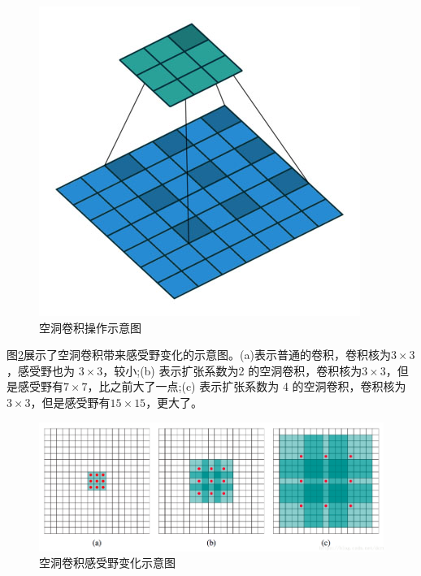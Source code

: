 \documentclass[cn]{elegantbook}
\begin{document}
\begin{figure}[!h]
\begin{minipage}[t]{0.3\textwidth}
	\end{minipage}
	\begin{minipage}[t]{0.3\textwidth}
		\centering
		\includegraphics[width=\textwidth]{images/dilation-02.jpg}
	\end{minipage}
	\caption{\label{dial}空洞卷积操作示意图}
\end{figure}

图\ref{dial2}展示了空洞卷积带来感受野变化的示意图。(a)表示普通的卷积，卷积核为$3\times3$，感受野也为 $3\times3$，较小;(b) 表示扩张系数为2 的空洞卷积，卷积核为$3\times3$，但是感受野有$7\times7$，比之前大了一点;(c) 表示扩张系数为 4 的空洞卷积，卷积核为$3\times3$，但是感受野有$15\times15$，更大了。
\begin{figure}[!h]
	\centering
	\includegraphics[width=\textwidth]{images/dilateconv}
	\caption{\label{dial2}空洞卷积感受野变化示意图}
\end{figure}
\end{document}
